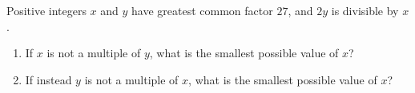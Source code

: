 Positive integers $x$ and $y$ have greatest common factor $27$, and $2y$ is divisible by $x$.
\begin{enumerate}
\item[(a)] If $x$ is not a multiple of $y$, what is the smallest possible value of $x$?
\item[(b)] If instead $y$ is not a multiple of $x$, what is the smallest possible value of $x$?
\end{enumerate}
